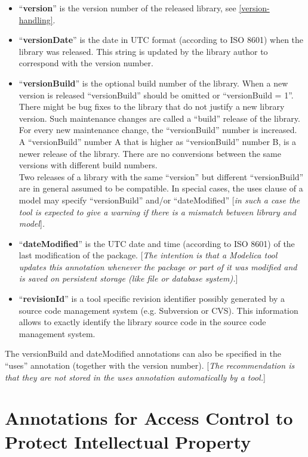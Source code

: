 \documentclass[10pt,a4paper]{report}
\def\doublelabel#1{\label{#1}}
\begin{document}
\begin{itemize}
\item
  ``\textbf{version}'' is the version number of the released library,
  see \ref{version-handling}.
\item
  ``\textbf{versionDate}'' is the date in UTC format (according to ISO
  8601) when the library was released. This string is updated by the
  library author to correspond with the version number.
\item
  ``\textbf{versionBuild}'' is the optional build number of the library.
  When a new version is released ``versionBuild'' should be omitted or
  ``versionBuild = 1''. There might be bug fixes to the library that do
  not justify a new library version. Such maintenance changes are called
  a ``build'' release of the library. For every new maintenance change,
  the ``versionBuild'' number is increased. A ``versionBuild'' number A
  that is higher as ``versionBuild'' number B, is a newer release of the
  library. There are no conversions between the same versions with
  different build numbers. \emph{\\
  }Two releases of a library with the same ``version'' but different
  ``versionBuild'' are in general assumed to be compatible. In special
  cases, the uses clause of a model may specify ``versionBuild'' and/or
  ``dateModified'' {[}\emph{in such a case the tool is expected to give
  a warning if there is a mismatch between library and model}{]}\emph{.}
\item
  ``\textbf{dateModified}'' is the UTC date and time (according to ISO
  8601) of the last modification of the package. {[}\emph{The intention
  is that a Modelica tool updates this annotation whenever the package
  or part of it was modified and is saved on persistent storage (like
  file or database system).}{]}
\item
  ``\textbf{revisionId}'' is a tool specific revision identifier
  possibly generated by a source code management system (e.g. Subversion
  or CVS). This information allows to exactly identify the library
  source code in the source code management system.
\end{itemize}

The versionBuild and dateModified annotations can also be specified in
the ``uses'' annotation (together with the version number). {[}\emph{The
recommendation is that they are not stored in the uses annotation
automatically by a tool.}{]}

\section{Annotations for Access Control to Protect Intellectual Property}\doublelabel{annotations-for-access-control-to-protect-intellectual-property}
\end{document}
